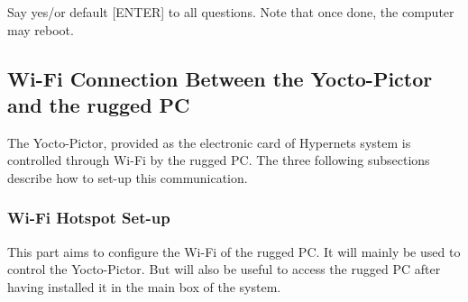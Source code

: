 \noindent Say yes/or default [ENTER] to all questions. Note that once done, the computer may 
reboot.

\clearpage

\subsection{Wi-Fi Connection Between the Yocto-Pictor and the rugged PC}
\vspace{16pt}

The Yocto-Pictor, provided as the electronic card of Hypernets system is
controlled through Wi-Fi by the rugged PC. The three following subsections
describe how to set-up this communication.

\subsubsection{Wi-Fi Hotspot Set-up}
\label{sec:wifirugged}
\par
This part aims to configure the Wi-Fi of the rugged PC. It will mainly be used
to control the Yocto-Pictor. But will also be useful to access the rugged PC
after having installed it in the main box of the system.

